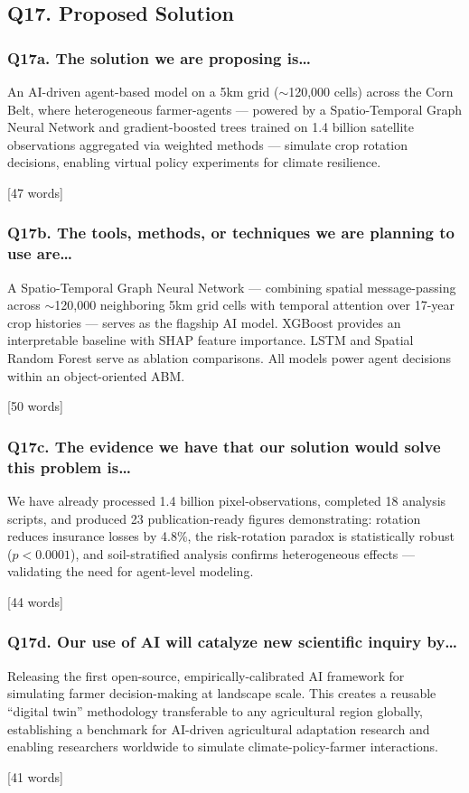 \documentclass[11pt,letterpaper]{article}
\newcommand{\answer}[1]{%
    \vspace{0.2em}%
    \noindent\colorbox{answerbox}{\parbox{\dimexpr\textwidth-2\fboxsep}{%
        \vspace{0.4em}#1\vspace{0.4em}%
    }}%
    \vspace{0.5em}%
}
\newcommand{\wordcount}[1]{%
    \hfill{\scriptsize\textcolor{notegray}{[#1 words]}}%
}
\begin{document}
\subsection{Q17. Proposed Solution}

\subsubsection{Q17a. The solution we are proposing is\ldots}
\answer{An AI-driven agent-based model on a 5km grid (${\sim}$120,000 cells) across the Corn Belt, where heterogeneous farmer-agents --- powered by a Spatio-Temporal Graph Neural Network and gradient-boosted trees trained on 1.4 billion satellite observations aggregated via weighted methods --- simulate crop rotation decisions, enabling virtual policy experiments for climate resilience.}
\wordcount{47}

\subsubsection{Q17b. The tools, methods, or techniques we are planning to use are\ldots}
\answer{A Spatio-Temporal Graph Neural Network --- combining spatial message-passing across ${\sim}$120,000 neighboring 5km grid cells with temporal attention over 17-year crop histories --- serves as the flagship AI model. XGBoost provides an interpretable baseline with SHAP feature importance. LSTM and Spatial Random Forest serve as ablation comparisons. All models power agent decisions within an object-oriented ABM.}
\wordcount{50}

\subsubsection{Q17c. The evidence we have that our solution would solve this problem is\ldots}
\answer{We have already processed 1.4 billion pixel-observations, completed 18 analysis scripts, and produced 23 publication-ready figures demonstrating: rotation reduces insurance losses by 4.8\%, the risk-rotation paradox is statistically robust ($p < 0.0001$), and soil-stratified analysis confirms heterogeneous effects --- validating the need for agent-level modeling.}
\wordcount{44}

\subsubsection{Q17d. Our use of AI will catalyze new scientific inquiry by\ldots}
\answer{Releasing the first open-source, empirically-calibrated AI framework for simulating farmer decision-making at landscape scale. This creates a reusable ``digital twin'' methodology transferable to any agricultural region globally, establishing a benchmark for AI-driven agricultural adaptation research and enabling researchers worldwide to simulate climate-policy-farmer interactions.}
\wordcount{41}
\end{document}
